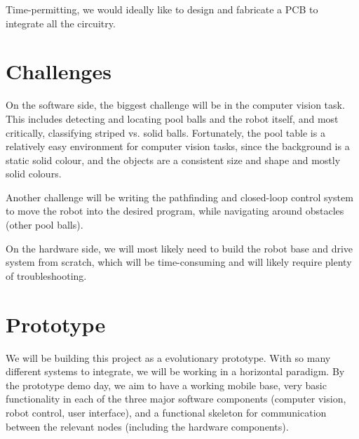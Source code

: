 \documentclass[11pt]{article}
\begin{document}
\vspace{-8pt}
Time-permitting, we would ideally like to design and fabricate a PCB to integrate all the circuitry.

\section*{Challenges}

On the software side, the biggest challenge will be in the computer vision task. This includes detecting and locating pool balls and the robot itself, and most critically, classifying striped vs. solid balls.
Fortunately, the pool table is a relatively easy environment for computer vision tasks, since the background is a static solid colour, and the objects are a consistent size and shape and mostly solid colours.

Another challenge will be writing the pathfinding and closed-loop control system to move the robot into the desired program, while navigating around obstacles (other pool balls).

On the hardware side, we will most likely need to build the robot base and drive system from scratch, which will be time-consuming and will likely require plenty of troubleshooting.

\section*{Prototype}

We will be building this project as a evolutionary prototype. With so many different systems to integrate, we will be working in a horizontal paradigm. By the prototype demo day, we aim to have a working mobile base, very basic functionality in each of the three major software components (computer vision, robot control, user interface), and a functional skeleton for communication between the relevant nodes (including the hardware components).

\end{document}
